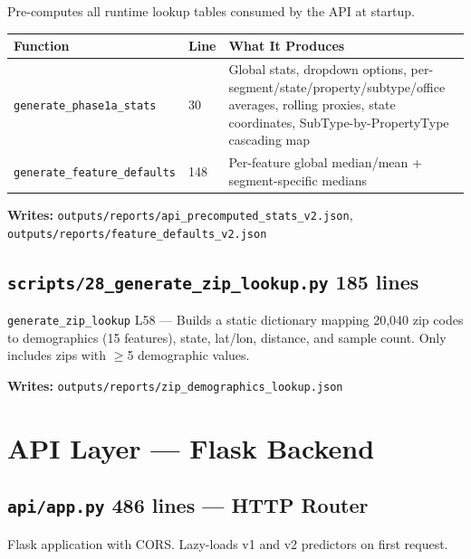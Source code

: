 \documentclass[11pt,a4paper]{article}
\newcommand{\file}[1]{\texttt{\color{gssblue!70!black}#1}}
\newcommand{\func}[1]{\texttt{\color{gssgreen!80!black}#1}}
\newcommand{\lineref}[1]{\textcolor{gssgray}{\small L#1}}
\newcommand{\pipetag}[1]{\colorbox{pipeblue!15}{\small\textcolor{pipeblue}{\textbf{#1}}}}
\newcommand{\apitag}[1]{\colorbox{apigreen!15}{\small\textcolor{apigreen}{\textbf{#1}}}}
\begin{document}
Pre-computes all runtime lookup tables consumed by the API at startup.

\begin{longtable}{l l p{8cm}}
\toprule
\textbf{Function} & \textbf{Line} & \textbf{What It Produces} \\
\midrule
\endhead
\func{generate\_phase1a\_stats} & 30 & Global stats, dropdown options, per-segment/state/property/subtype/office averages, rolling proxies, state coordinates, SubType-by-PropertyType cascading map \\
\func{generate\_feature\_defaults} & 148 & Per-feature global median/mean + segment-specific medians \\
\bottomrule
\end{longtable}

\textbf{Writes:} \file{outputs/reports/api\_precomputed\_stats\_v2.json}, \file{outputs/reports/feature\_defaults\_v2.json}

\subsection{\file{scripts/28\_generate\_zip\_lookup.py} \pipetag{185 lines}}

\func{generate\_zip\_lookup} \lineref{58} --- Builds a static dictionary mapping
20,040 zip codes to demographics (15 features), state, lat/lon, distance, and sample
count. Only includes zips with $\geq$5 demographic values.

\textbf{Writes:} \file{outputs/reports/zip\_demographics\_lookup.json}

\section{API Layer --- Flask Backend}
\label{sec:api}

\subsection{\file{api/app.py} \apitag{486 lines} --- HTTP Router}

Flask application with CORS. Lazy-loads v1 and v2 predictors on first request.
\end{document}
